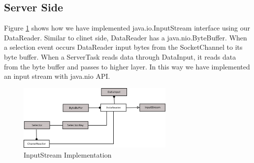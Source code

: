 \subsection{Server Side}
Figure \ref{server} shows how we have implemented java.io.InputStream interface using our DataReader. Similar to clinet side, DataReader has a java.nio.ByteBuffer. When a selection event occurs DataReader input bytes from the SocketChannel to its byte buffer. When a ServerTask reads data through DataInput, it reads data from the byte buffer and passes to higher layer. In this way we have implemented an input stream with java.nio API.
\begin{figure}[!t]
        \centering
        \includegraphics[width=3.0in]{server.png}
        \caption{InputStream Implementation}
        \label{server}
\end{figure}
